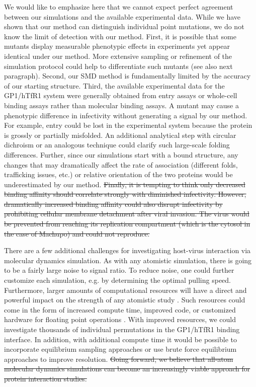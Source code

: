 \documentclass[12pt]{article} %
\providecommand{\DIFdel}[1]{{\protect\color{red}\sout{#1}}}                      %
\providecommand{\DIFaddbegin}{} %
\providecommand{\DIFaddend}{} %
\providecommand{\DIFdelbegin}{} %
\providecommand{\DIFdelend}{} %
\begin{document}
We would like to emphasize here that we cannot expect perfect agreement between our simulations and the available experimental data. While we have shown that our method can distinguish individual point mutations, we do not know the limit of detection with our method. First, it is possible that some mutants display measurable phenotypic effects in experiments yet appear identical under our method. More extensive sampling or refinement of the simulation protocol could help to differentiate such mutants (see also next paragraph). Second, our SMD method is fundamentally limited by the accuracy of our starting structure. Third, the available experimental data for the GP1/hTfR1 system were generally obtained from entry assays or whole-cell binding assays rather than molecular binding assays. A mutant may cause a phenotypic difference in infectivity without generating a signal by our method. For example, entry could be lost in the experimental system because the protein is grossly or partially misfolded. An additional analytical step with circular dichroism or an analogous technique could clarify such large-scale folding differences. Further, since our simulations start with a bound structure, any changes that may dramatically affect the rate of association (different folds, trafficking issues, etc.) or relative orientation of the two proteins would be underestimated by our method. 
\DIFdelbegin \DIFdel{Finally, it is tempting to think only decreased binding affinity should correlate strongly with diminished infectivity. However, dramatically increased binding affinity could also disrupt infectivity by prohibiting cellular membrane detachment after viral invasion. The virus would be prevented from reaching its replication compartment (which is the cytosol in the case of Machupo) and could not reproduce.
}\DIFdelend 

There are a few additional challenges for investigating host-virus interaction via molecular dynamics simulation. As with any atomistic simulation, there is going to be a fairly large noise to signal ratio. To reduce noise, one could further customize each simulation, e.g. by determining the optimal pulling speed. Furthermore, larger amounts of computational resources will have a direct and powerful impact on the strength of any atomistic study \DIFdelbegin %
\DIFdelend \DIFaddbegin \citep{Shaw2012}\DIFaddend . Such resources could come in the form of increased compute time, improved code, or customized hardware for floating point operations \DIFdelbegin %
\DIFdelend \DIFaddbegin \citep{Shaw2011}\DIFaddend . With improved resources, we could investigate thousands of individual permutations in the GP1/hTfR1 binding interface. In addition, with additional compute time it would be possible to incorporate equilibrium sampling approaches \DIFdelbegin %
\DIFdelend \DIFaddbegin \citep{Buch2011} \DIFaddend or use brute force equilibrium approaches \DIFdelbegin %
\DIFdelend \DIFaddbegin \citep{Giorgino2012} \DIFaddend to improve resolution. 
\DIFdelbegin \DIFdel{Going forward, we believe that all-atom molecular dynamics simulations can become an increasingly viable approach for protein interaction studies. }\DIFdelend 
\end{document}

